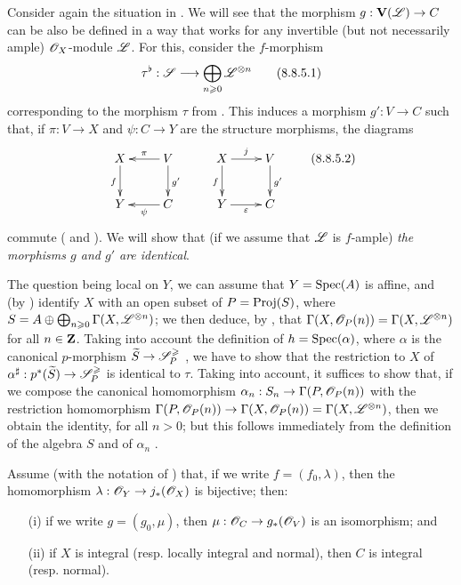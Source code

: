 \begin{env}[8.8.5]
Consider again the situation in .
We will see that the morphism $g:\bb{V}(\sh{L})\to C$ can be also be defined in a way that works for any invertible (but not necessarily ample) $\mathscr{O}_X$-module $\mathscr{L}$.
For this, consider the $f$-morphism
\[
\label{II.8.8.5.1}
  \tau^\flat: \sh{S} \to \bigoplus_{n\geq0}\sh{L}^{\otimes n}
\tag{8.8.5.1}
\]
corresponding to the morphism $\tau$ from .
This induces  a morphism $g':V\to C$ such that, if $\pi:V\to X$ and $\psi:C\to Y$ are the structure morphisms, the diagrams
\[
\label{II.8.8.5.2}
  \xymatrix{
    X
      \ar[d]_{f}
  & V
      \ar[l]_{\pi}
      \ar[d]^{g'}
  \\Y
  & C
      \ar[l]^{\psi}
  }
  \qquad
  \xymatrix{
    X
      \ar[r]^{j}
      \ar[d]_{f}
  & V
      \ar[d]^{g'}
  \\Y
      \ar[r]_{\varepsilon}
  & C
  }
\tag{8.8.5.2}
\]
commute ( and ).
We will show that (if we assume that $\mathscr{L}$ is $f$-ample) \emph{the morphisms $g$ and $g'$ are identical}.

The question being local on $Y$, we can assume that $Y=\operatorname{Spec}(A)$ is affine, and (by ) identify $X$ with an open subset of $P=\operatorname{Proj}(S)$, where $S=A\oplus\bigoplus_{n\geqslant0}\Gamma(X,\mathscr{L}^{\otimes n})$;
we then deduce, by , that $\Gamma(X,\mathscr{O}_P(n))=\Gamma(X,\mathscr{L}^{\otimes n})$ for all $n\in\mathbf{Z}$.
Taking into account the definition of $h=\operatorname{Spec}(\alpha)$, where $\alpha$ is the canonical $p$-morphism $\widetilde{S}\to\sh{S}_P^\geq$ , we have to show that the restriction to $X$ of $\alpha^\sharp:p^*(\widetilde{S})\to\sh{S}_P^\geq$ is identical to $\tau$.
Taking  into account, it suffices to show that, if we compose the canonical homomorphism $\alpha_n:S_n\to\Gamma(P,\sh{O}_P(n))$ with the restriction homomorphism $\Gamma(P,\sh{O}_P(n))\to\Gamma(X,\sh{O}_P(n))=\Gamma(X,\sh{L}^{\otimes n})$, then we obtain the identity, for all $n>0$;
but this follows immediately from the definition of the algebra $S$ and of $\alpha_n$ .
\end{env}

\begin{proposition}[8.8.6]
\label{II.8.8.6}
Assume (with the notation of ) that, if we write $f=(f_0,\lambda)$, then the homomorphism $\lambda:\sh{O}_Y\to j_*(\sh{O}_X)$ is bijective;
then:
\begin{enumerate}
  \item[\rm{(i)}] if we write $g=(g_0,\mu)$, then $\mu:\sh{O}_C\to g_*(\sh{O}_V)$ is an isomorphism; and
  \item[\rm{(ii)}] if $X$ is integral (resp. locally integral and normal), then $C$ is integral (resp. normal).
\end{enumerate}
\end{proposition}

